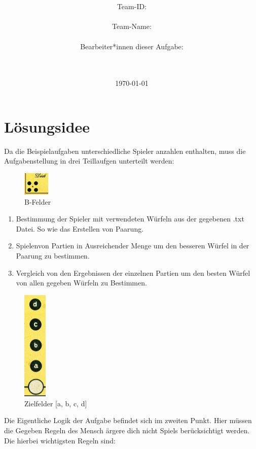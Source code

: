 \documentclass[a4paper,11pt,ngerman]{scrartcl}
\title{\textbf{\Huge\Aufgabe}}
\author{\LARGE Team-ID: \LARGE \TeamId \\\\
	    \LARGE Team-Name: \LARGE \TeamName \\\\
	    \LARGE Bearbeiter*innen dieser Aufgabe: \\ 
	    \LARGE \Namen\\\\}
\date{\LARGE\today}
\begin{document}
\maketitle
\tableofcontents

\vspace{0.5cm}


\section{Lösungsidee}
 
Da die Beispielaufgaben unterschiedliche Spieler anzahlen enthalten, muss die Aufgabenstellung in drei
Teillaufgen unterteilt werden:\\
\begin{figure} 
	\includegraphics[width=0.11\textwidth]{home}	
	\centering
	\caption{B-Felder}
	\label{fig:B-Felder}
\end{figure}
\begin{enumerate}
	\item Bestimmung der Spieler mit verwendeten Würfeln aus der gegebenen .txt Datei. So wie das Erstellen von Paarung.
	\item \glqq Spielen\grqq von Partien in Ausreichender Menge um den besseren Würfel in der Paarung zu bestimmen.
	\item Vergleich von den Ergebnissen der einzelnen Partien um den besten Würfel von allen gegeben Würfeln zu Bestimmen.
\end{enumerate}
\begin{figure} 
	\includegraphics[width=0.1\textwidth]{goal}	
	\centering
	\caption{Zielfelder [a, b, c, d]}
	\label{fig:Zielfelder}
\end{figure}
Die Eigentliche Logik der Aufgabe befindet sich im zweiten Punkt. Hier müssen die Gegeben Regeln des Mensch ärgere dich nicht Spiels berücksichtigt werden. Die hierbei wichtigsten Regeln sind:\\
\end{document}
